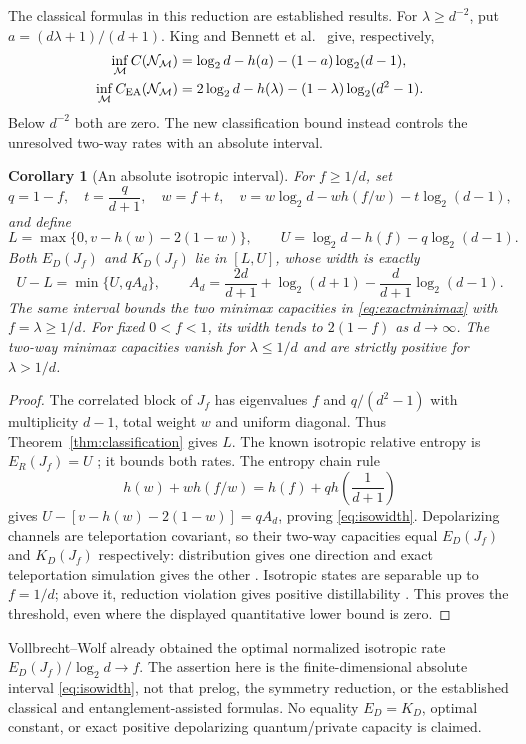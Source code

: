 \documentclass[11pt]{article}
\newtheorem{corollary}[theorem]{Corollary}
\begin{document}
The classical formulas in this reduction are established results.
For $\lambda\ge d^{-2}$, put $a=(d\lambda+1)/(d+1)$. King
\cite[Theorem 1]{king} and Bennett et al.\ \cite{bsst} give, respectively,
\begin{align*}
 \inf_{\mathcal M}C(\mathcal N_{\mathcal M})
 &=\log_2d-h(a)-(1-a)\log_2(d-1),\\
 \inf_{\mathcal M}C_{\rm EA}(\mathcal N_{\mathcal M})
 &=2\log_2d-h(\lambda)-(1-\lambda)\log_2(d^2-1).
\end{align*}
Below $d^{-2}$ both are zero. The new classification bound instead
controls the unresolved two-way rates with an absolute interval.

\begin{corollary}[An absolute isotropic interval]\label{cor:isotropic}
For $f\ge1/d$, set
\[
 q=1-f,\quad t=\frac{q}{d+1},\quad w=f+t,\quad
 v=w\log_2d-wh(f/w)-t\log_2(d-1),
\]
and define
\[
 L=\max\{0,v-h(w)-2(1-w)\},\qquad
 U=\log_2d-h(f)-q\log_2(d-1).
\]
Both $E_D(J_f)$ and $K_D(J_f)$ lie in $[L,U]$, whose width is exactly
\begin{equation}\label{eq:isowidth}
 U-L=\min\{U,qA_d\},\qquad
 A_d=\frac{2d}{d+1}+\log_2(d+1)-\frac{d}{d+1}\log_2(d-1).
\end{equation}
The same interval bounds the two minimax capacities in
\eqref{eq:exactminimax} with $f=\lambda\ge1/d$.
For fixed $0<f<1$, its width tends to $2(1-f)$ as $d\to\infty$.
The two-way minimax capacities vanish for $\lambda\le1/d$ and are
strictly positive for $\lambda>1/d$.
\end{corollary}
\begin{proof}
The correlated block of $J_f$ has eigenvalues $f$ and
$q/(d^2-1)$ with multiplicity $d-1$, total weight $w$ and uniform
diagonal. Thus Theorem~\ref{thm:classification} gives $L$.
The known isotropic relative entropy is $E_R(J_f)=U$
\cite[Supplementary Note 5, Eqs.\ (S195)--(S196)]{plob}; it bounds
both rates. The entropy chain rule
\[
 h(w)+wh(f/w)=h(f)+q h\!\left(\frac1{d+1}\right)
\]
gives $U-[v-h(w)-2(1-w)]=qA_d$, proving \eqref{eq:isowidth}.
Depolarizing channels are teleportation covariant, so their two-way
capacities equal $E_D(J_f)$ and $K_D(J_f)$ respectively: distribution
gives one direction and exact teleportation simulation gives the other
\cite{bdsw,plob}. Isotropic states are separable up to $f=1/d$;
above it, reduction violation gives positive distillability
\cite{hh,vw}. This proves the threshold, even where the displayed
quantitative lower bound is zero.
\end{proof}
Vollbrecht--Wolf \cite[Section VI.B--C, Eqs.\ (40)--(47)]{vw}
already obtained the optimal normalized isotropic rate
$E_D(J_f)/\log_2d\to f$. The assertion here is the finite-dimensional
absolute interval \eqref{eq:isowidth}, not that prelog, the symmetry
reduction, or the established classical and entanglement-assisted
formulas. No equality $E_D=K_D$, optimal constant, or exact positive
depolarizing quantum/private capacity is claimed.
\end{document}
